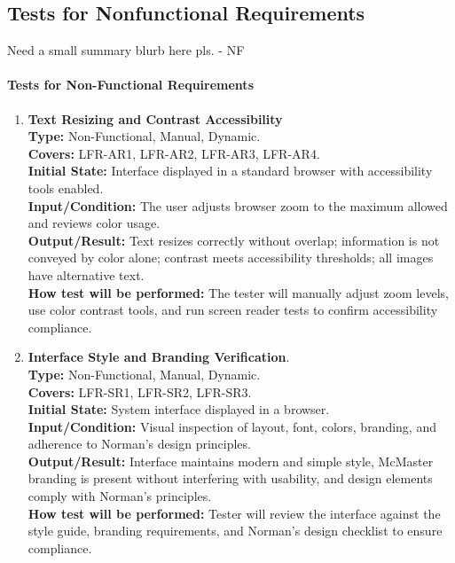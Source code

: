 \documentclass[12pt, titlepage]{article}
\begin{document}
\subsection{Tests for Nonfunctional Requirements}

{Need a small summary blurb here pls. - NF}

\paragraph{Tests for Non-Functional Requirements}

\begin{enumerate}[label=NFR-ST \arabic*., wide=0pt, leftmargin=*]

  \item{}
    \textbf{Text Resizing and Contrast Accessibility} \\[2mm]
    \textbf{Type:} Non-Functional, Manual, Dynamic. \\
    \textbf{Covers:} LFR-AR1, LFR-AR2, LFR-AR3, LFR-AR4. \\
    \textbf{Initial State:} Interface displayed in a standard browser
    with accessibility tools enabled. \\
    \textbf{Input/Condition:} The user adjusts browser zoom to the
    maximum allowed and reviews color usage. \\
    \textbf{Output/Result:} Text resizes correctly without overlap;
    information is not conveyed by color alone; contrast meets
    accessibility thresholds; all images have alternative text. \\[2mm]
    \textbf{How test will be performed:} The tester will manually
    adjust zoom levels, use color contrast tools, and run screen
    reader tests to confirm accessibility compliance.

  \item \textbf{Interface Style and Branding Verification}. \\[2mm]
    \textbf{Type:} Non-Functional, Manual, Dynamic. \\
    \textbf{Covers:} LFR-SR1, LFR-SR2, LFR-SR3. \\
    \textbf{Initial State:} System interface displayed in a browser. \\
    \textbf{Input/Condition:} Visual inspection of layout, font,
    colors, branding, and adherence to Norman's design principles. \\
    \textbf{Output/Result:} Interface maintains modern and simple
    style, McMaster branding is present without interfering with
    usability, and design elements comply with Norman’s principles. \\[2mm]
    \textbf{How test will be performed:} Tester will review the
    interface against the style guide, branding requirements, and
    Norman’s design checklist to ensure compliance.


\end{enumerate}
\end{document}
